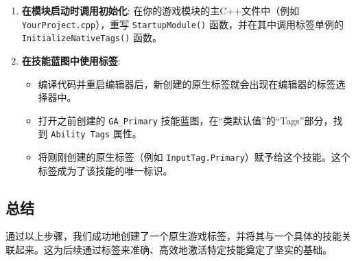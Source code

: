 \documentclass[math,code,10pt,CJKmath]{amznotes}
\begin{document}
\begin{enumerate}
    \item \textbf{在模块启动时调用初始化}: 在你的游戏模块的主C++文件中（例如 \texttt{YourProject.cpp}），重写 \texttt{StartupModule()} 函数，并在其中调用标签单例的 \texttt{InitializeNativeTags()} 函数。
    
    \item \textbf{在技能蓝图中使用标签}:
    \begin{itemize}
        \item 编译代码并重启编辑器后，新创建的原生标签就会出现在编辑器的标签选择器中。
        \item 打开之前创建的 \texttt{GA\_Primary} 技能蓝图，在“类默认值”的“Tags”部分，找到 \texttt{Ability Tags} 属性。
        \item 将刚刚创建的原生标签（例如 \texttt{InputTag.Primary}）赋予给这个技能。这个标签成为了该技能的唯一标识。
    \end{itemize}
\end{enumerate}

\subsection{总结}
通过以上步骤，我们成功地创建了一个原生游戏标签，并将其与一个具体的技能关联起来。这为后续通过标签来准确、高效地激活特定技能奠定了坚实的基础。
\end{document}
